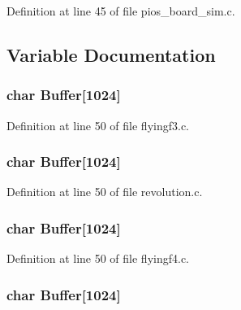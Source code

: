 Definition at line 45 of file pios\-\_\-board\-\_\-sim.\-c.



\subsection{Variable Documentation}
\hypertarget{group___open_pilot_core_gaaf1490d688e7cf0c41987d87572ff80a}{
\subsubsection[{Buffer}]{\setlength{\rightskip}{0pt plus 5cm}char Buffer\mbox{[}1024\mbox{]}}}\label{group___open_pilot_core_gaaf1490d688e7cf0c41987d87572ff80a}


Definition at line 50 of file flyingf3.\-c.

\hypertarget{group___open_pilot_core_gaaf1490d688e7cf0c41987d87572ff80a}{
\subsubsection[{Buffer}]{\setlength{\rightskip}{0pt plus 5cm}char Buffer\mbox{[}1024\mbox{]}}}\label{group___open_pilot_core_gaaf1490d688e7cf0c41987d87572ff80a}


Definition at line 50 of file revolution.\-c.

\hypertarget{group___open_pilot_core_gaaf1490d688e7cf0c41987d87572ff80a}{
\subsubsection[{Buffer}]{\setlength{\rightskip}{0pt plus 5cm}char Buffer\mbox{[}1024\mbox{]}}}\label{group___open_pilot_core_gaaf1490d688e7cf0c41987d87572ff80a}


Definition at line 50 of file flyingf4.\-c.

\hypertarget{group___open_pilot_core_gaaf1490d688e7cf0c41987d87572ff80a}{
\subsubsection[{Buffer}]{\setlength{\rightskip}{0pt plus 5cm}char Buffer\mbox{[}1024\mbox{]}}}\label{group___open_pilot_core_gaaf1490d688e7cf0c41987d87572ff80a}


